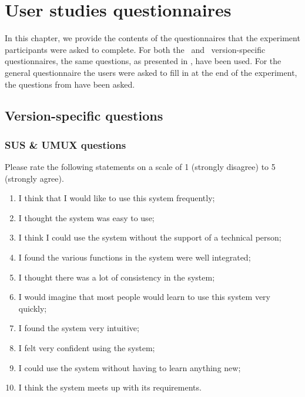 \chapter{User studies questionnaires}

In this chapter, we provide the contents of the questionnaires that the experiment participants were asked to complete. For both the \IDa\ and \IDb\ version-specific questionnaires, the same questions, as presented in , have been used. For the general questionnaire the users were asked to fill in at the end of the experiment, the questions from  have been asked.



\section{Version-specific questions}


\subsection*{SUS \& UMUX questions}
Please rate the following statements on a scale of 1 (strongly disagree) to 5 (strongly agree).
\begin{enumerate}
\item I think that I would like to use this system frequently;
\item I thought the system was easy to use;
\item I think I could use the system without the support of a technical person;
\item I found the various functions in the system were well integrated;
\item I thought there was a lot of consistency in the system;
\item I would imagine that most people would learn to use this system very quickly;
\item I found the system very intuitive;
\item I felt very confident using the system;
\item I could use the system without having to learn anything new;
\item I think the system meets up with its requirements.
\end{enumerate}


